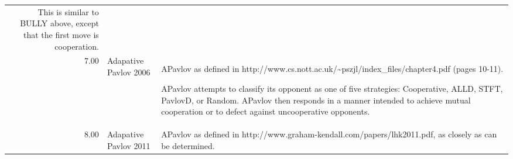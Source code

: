 \begin{table}[!hbtp]
\begin{adjustbox}{width=2\textwidth, angle=90}
\begin{tabular}{rll}
	This is similar to BULLY above, except that the first move is cooperation.                                                                                                                                                                                                                                                                                                                                                                                                                                                                                                                                                                                                                                                                                                                                                                                                                                                                        \\
	7.00   & Adapative Pavlov 2006       & APavlov as defined in http://www.cs.nott.ac.uk/\textasciitilde{}pszjl/index\_files/chapter4.pdf
	(pages 10-11).

	APavlov attempts to classify its opponent as one of five strategies:
	Cooperative, ALLD, STFT, PavlovD, or Random. APavlov then responds in a
	manner intended to achieve mutual cooperation or to defect against
	uncooperative opponents.                                                                                                                                                                                                                                                                                                                                                                                                                                                                                                                                                                                                                                                              \\
	8.00   & Adapative Pavlov 2011       & APavlov as defined in http://www.graham-kendall.com/papers/lhk2011.pdf, as
	closely as can be determined.


\end{tabular}
\end{adjustbox}
\end{table}
